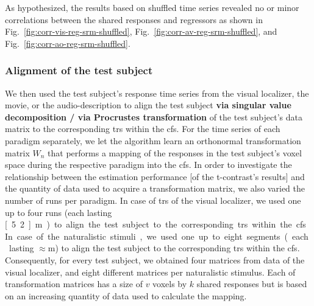%
As hypothesized, the results based on shuffled time series revealed no or minor
correlations between the shared responses and regressors as shown in
Fig.~\ref{fig:corr-vis-reg-srm-shuffled},
Fig.~\ref{fig:corr-av-reg-srm-shuffled}, and
Fig.~\ref{fig:corr-ao-reg-srm-shuffled}.




\subsubsection{Alignment of the test subject}






%
We then used the test subject's response time series from the visual localizer,
the movie, or the audio-description to align the test subject \textbf{via
singular value decomposition / via Procrustes transformation} of the test
subject's data matrix to the corresponding \acp{tr} within the \ac{cfs}.
%
For the time series of each paradigm separately, we let the algorithm learn
an orthonormal transformation matrix $W_{n}$ that performs a mapping of the
responses in the test subject's voxel space during the respective paradigm into
the \ac{cfs}.
%
In order to investigate the relationship between the estimation performance [of
the t-contrast's results] and the quantity of data used to acquire a
transformation matrix, we also varied the number of runs per paradigm.
%
In case of \acp{tr} of the visual localizer, we used one up to four runs (each
lasting \unit[5.2]{m}) to align the test subject to the corresponding \acp{tr}
within the \ac{cfs}.
%
In case of the naturalistic stimuli, we used one up to eight segments (each
lasting $\approx$\unit[15]{m}) to align the test subject to the corresponding
\acp{tr} within the \ac{cfs}.
%
Consequently, for every test subject, we obtained four matrices from data of the
visual localizer, and eight different matrices per naturalistic stimulus.
%
Each of transformation matrices has a size of $v$ voxels by $k$ shared responses
but is based on an increasing quantity of data used to calculate the mapping.


